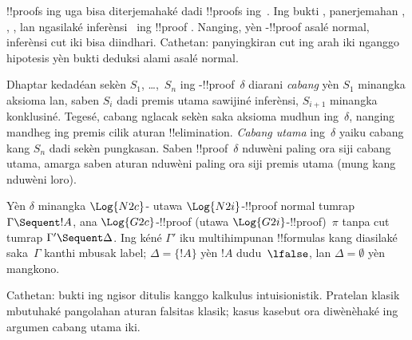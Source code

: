 \documentclass[../../../include/open-logic-section]{subfiles}
\begin{document}
!!{proof}s ing  uga bisa diterjemahaké dadi !!{proof}s
ing~. Ing bukti ,
panerjemahan \Elim{\land}, \Elim{\lif}, \Elim{\lnot}, lan
\Elim{\lforall} ngasilaké inferènsi~\Cut{} ing !!{proof}
. Nanging, yèn -!!{proof} asalé normal,
inferènsi cut iki bisa diindhari.
Cathetan: panyingkiran cut ing arah iki nganggo hipotesis yèn bukti deduksi alami asalé normal.

Dhaptar kedadéan sekèn $S_1$, \dots,~$S_n$ ing
-!!{proof}~$\delta$ diarani \emph{cabang} yèn $S_1$
minangka aksioma lan, saben $S_i$ dadi premis utama sawijiné
inferènsi, $S_{i+1}$ minangka konklusiné. Tegesé, cabang
nglacak sekèn saka aksioma mudhun ing~$\delta$, nanging mandheg
ing premis cilik aturan !!{elimination}. \emph{Cabang utama}
ing~$\delta$ yaiku cabang kang $S_n$ dadi sekèn pungkasan.
Saben !!{proof}~$\delta$ nduwèni paling ora siji cabang utama,
amarga saben aturan nduwèni paling ora siji premis utama
(mung \Intro{\land} kang nduwèni loro).


\begin{prop} Yèn $\delta$
minangka $\Log{N2c}$- utawa $\Log{N2i}$-!!{proof} normal tumrap
$\Gamma \Sequent !A$, ana $\Log{G2c}$-!!{proof} (utawa
$\Log{G2i}$-!!{proof})~$\pi$ tanpa cut tumrap
$\Gamma' \Sequent \Delta$. Ing kéné $\Gamma'$ iku multihimpunan
!!{formula}s kang diasilaké saka~$\Gamma$ kanthi mbusak label;
$\Delta = \{!A\}$ yèn $!A$ dudu~$\lfalse$, lan
$\Delta = \emptyset$ yèn mangkono.
\end{prop}
Cathetan: bukti ing ngisor ditulis kanggo kalkulus intuisionistik. Pratelan klasik mbutuhaké pangolahan aturan falsitas klasik; kasus kasebut ora diwènèhaké ing argumen cabang utama iki.
\end{document}
